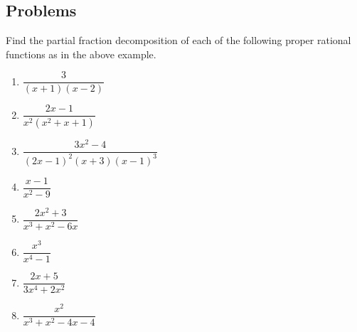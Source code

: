 \documentclass[12pt,letterpaper,fleqn]{article}
\theoremstyle{definition}
\begin{document}
\subsection*{Problems}
Find the partial fraction decomposition of each of the following proper rational functions as in the above example.
\begin{enumerate}
  \item $\dfrac{3}{(x + 1)(x - 2)}$
  \item $\dfrac{2x-1}{x^2(x^2 + x + 1)}$
  \item $\dfrac{3x^2 - 4}{(2x-1)^2 (x+3) (x-1)^3}$
  \item $\dfrac{x - 1}{x^2 - 9}$
  \item $\dfrac{2x^2 + 3}{x^3 + x^2 - 6x}$
  \item $\dfrac{x^3}{x^4 - 1}$
  \item $\dfrac{2x + 5}{3x^4 + 2x^2}$
  \item $\dfrac{x^2}{x^3 + x^2 - 4x - 4}$
\end{enumerate}
\end{document}
